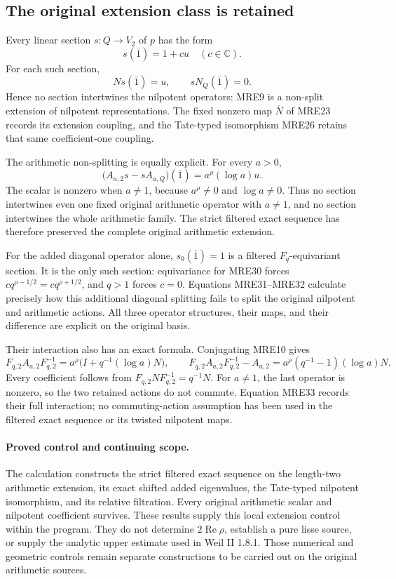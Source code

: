\subsection{The original extension class is retained}

Every linear section \(s:Q\to V_2\) of \(p\) has the form
\[
 s(\overline{1})=1+c u\quad(c\in\mathbb C).
 \tag{MRE30}
\]
For each such section,
\[
 Ns(\overline{1})=u,\qquad sN_Q(\overline{1})=0.
 \tag{MRE31}
\]
Hence no section intertwines the nilpotent operators: MRE9 is a
non-split extension of nilpotent representations. The fixed nonzero map
\(\overline N\) of MRE23 records its extension coupling, and the
Tate-typed isomorphism MRE26 retains that same coefficient-one coupling.

The arithmetic non-splitting is equally explicit. For every \(a>0\),
\[
 \bigl(A_{a,2}s-sA_{a,Q}\bigr)(\overline{1})
       =a^\rho(\log a)u.
 \tag{MRE32}
\]
The scalar is nonzero when \(a\ne1\), because \(a^\rho\ne0\) and
\(\log a\ne0\). Thus no section intertwines even one fixed original
arithmetic operator with \(a\ne1\), and no section intertwines the
whole arithmetic family. The strict filtered exact sequence has
therefore preserved the complete original arithmetic extension.

For the added diagonal operator alone, \(s_0(\overline{1})=1\) is a
filtered \(F_q\)-equivariant section. It is the only such section:
equivariance for MRE30 forces
\(c q^{\rho-1/2}=c q^{\rho+1/2}\), and \(q>1\) forces \(c=0\).
Equations MRE31--MRE32 calculate precisely how this additional
diagonal splitting fails to split the original nilpotent and arithmetic
actions. All three operator structures, their maps, and their difference
are explicit on the original basis.

Their interaction also has an exact formula. Conjugating MRE10 gives
\[
 F_{q,2}A_{a,2}F_{q,2}^{-1}
   =a^\rho\bigl(I+q^{-1}(\log a)N\bigr),\qquad
 F_{q,2}A_{a,2}F_{q,2}^{-1}-A_{a,2}
   =a^\rho(q^{-1}-1)(\log a)N.
 \tag{MRE33}
\]
Every coefficient follows from \(F_{q,2}NF_{q,2}^{-1}=q^{-1}N\).
For \(a\ne1\), the last operator is nonzero, so the two retained
actions do not commute. Equation MRE33 records their full interaction;
no commuting-action assumption has been used in the filtered exact
sequence or its twisted nilpotent maps.

\paragraph{Proved control and continuing scope.}
The calculation constructs the strict filtered exact sequence on the
length-two arithmetic extension, its exact shifted added eigenvalues,
the Tate-typed nilpotent isomorphism, and its relative filtration.
Every original arithmetic scalar and nilpotent coefficient survives.
These results supply this local extension control within the program.
They do not determine \(2\operatorname{Re}\rho\), establish a pure lisse
source, or supply the analytic upper estimate used in Weil II 1.8.1.
Those numerical and geometric controls remain separate constructions
to be carried out on the original arithmetic sources.
